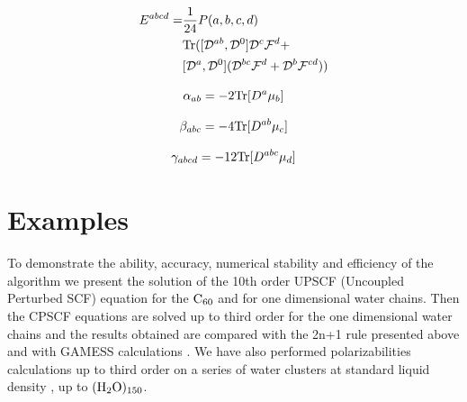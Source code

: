 \documentclass[prl,aps,twocolumn,showpacs,twocolumngrid,superbib]{revtex4}
\def\Tr{{\rm Tr}}
\def\F{\mathcal{F}}
\def\D{\mathcal{D}}
\begin{document}
\begin{equation}
  \begin{split}
    E^{abcd}=&\frac{1}{24}P(a,b,c,d) \\
    &\Tr([\D^{ab},\D^0] \D^c \F^d + \\ 
    &[\D^a,\D^0](\D^{bc} \F^d +\D^b \F^{cd}))
  \end{split}
\end{equation}

\begin{equation}
  \alpha_{ab}=-2\Tr[D^a\mu_b]
\end{equation}

\begin{equation}
  \beta_{abc}=-4\Tr[D^{ab}\mu_c]
\end{equation}

\begin{equation}
  \gamma_{abcd}=-12\Tr[D^{abc}\mu_d]
\end{equation}


\section{Examples}
To demonstrate the ability, accuracy, numerical stability and efficiency 
of the algorithm we present
the solution of the 10th order UPSCF (Uncoupled Perturbed SCF) 
equation for the $\rm C_{60}$ and for one dimensional water chains. 
Then the CPSCF equations are solved up to third order for the one dimensional 
water chains and the results obtained are compared with the 2n+1 rule presented 
above and with GAMESS calculations \cite{gamess}. We have also performed polarizabilities
calculations up to third order on a series of water clusters at standard 
liquid density \cite{MChallacombe97,ESchwegler97}, up to $(\rm H_2O)_{150}$. 
\end{document}
